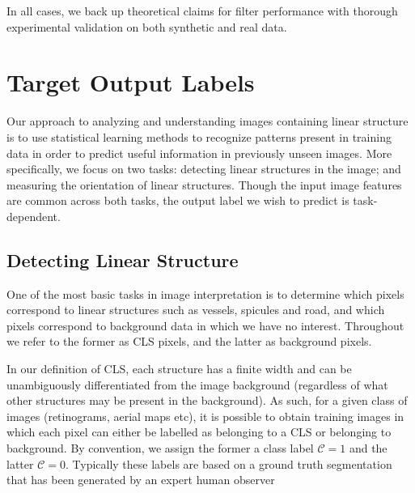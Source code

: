 \documentclass{IEEEtran}
\newcommand{\comment}[1]{}
\begin{document}
In all cases, we back up theoretical claims for filter performance with thorough experimental validation on both synthetic and real data.



\section{Target Output Labels}
Our approach to analyzing and understanding images containing linear structure is to use statistical learning methods to recognize patterns present in training data in order to predict useful information in previously unseen images. More specifically, we focus on two tasks: detecting linear structures in the image; and measuring the orientation of linear structures. Though the input image features are common across both tasks, the output label we wish to predict is task-dependent.

\subsection{Detecting Linear Structure}

One of the most basic tasks in image interpretation is to determine which pixels correspond to linear structures such as vessels, spicules and road, and which pixels correspond to background data in which we have no interest. Throughout we refer to the former as CLS pixels, and the latter as background pixels.

\comment{Segmenting curvilinear structures such as blood vessels, ducts and nerve fibres in medical images is an important task, as shown by the extensive literature in the field~\cite{Papari_Petkov_IVC11,Staal_etal_TMI04,Ricci_Perfetti_TMI07}.}

In our definition of CLS, each structure has a finite width and can be unambiguously differentiated from the image background (regardless of what other structures may be present in the background). As such, for a given class of images (retinograms, aerial maps etc), it is possible to obtain training images in which each pixel can either be labelled as belonging to a CLS or belonging to background. By convention, we assign the former a class label $\mathcal{C}=1$ and the latter $\mathcal{C}=0$. Typically these labels are based on a ground truth segmentation that has been generated by an expert human observer
\end{document}
